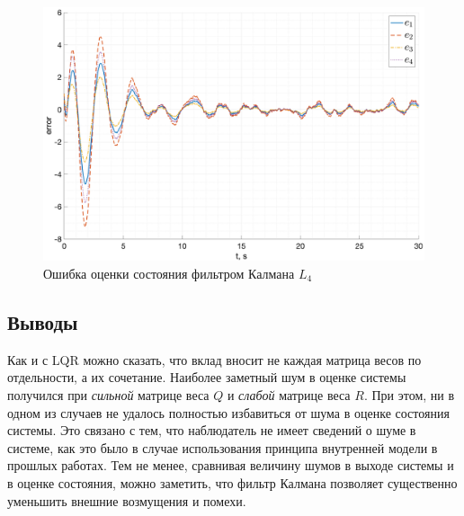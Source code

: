 \begin{figure}[ht!]
    \centering
    \includegraphics[width=\textwidth]{media/plots/kalman_task2/err_4.png}
    \caption{Ошибка оценки состояния фильтром Калмана $L_4$}
    \label{fig:kalman4_err}
\end{figure}
   

\FloatBarrier
\subsection{Выводы}
Как и с LQR можно сказать, что вклад вносит не каждая матрица весов по отдельности, а их сочетание.
Наиболее заметный шум в оценке системы получился при \textit{сильной} матрице веса $Q$ и
\textit{слабой} матрице веса $R$. При этом, ни в одном из случаев не удалось полностью 
избавиться от шума в оценке состояния системы. Это связано с тем, что наблюдатель 
не имеет сведений о шуме в системе, как это было в случае использования принципа внутренней 
модели в прошлых работах. Тем не менее, сравнивая величину шумов в выходе системы и в оценке состояния,
можно заметить, что фильтр Калмана позволяет существенно уменьшить внешние возмущения и помехи. 